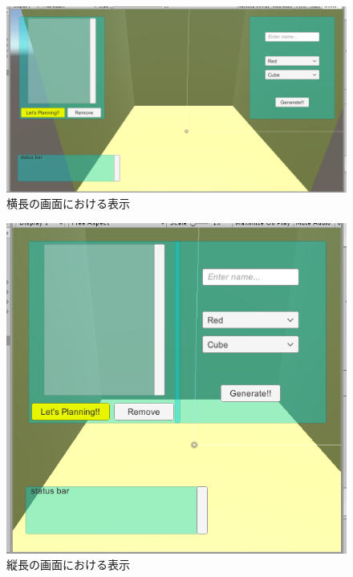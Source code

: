 \documentclass[12pt]{jarticle}
\begin{document}
\begin{figure}[!hbt]
  \begin{center}
    \includegraphics[scale=0.5]{images/BWP_Work6/anchor2.png}
  \end{center}
  \caption{横長の画面における表示}
  \label{fig:an2}
\end{figure}

\begin{figure}[!hbt]
  \begin{center}
    \includegraphics[scale=0.5]{images/BWP_Work6/anchor3.png}
  \end{center}
  \caption{縦長の画面における表示}
  \label{fig:an3}
\end{figure}
\end{document}

